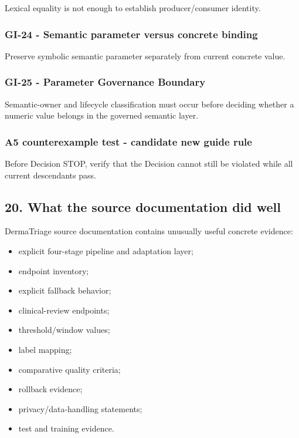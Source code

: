 \documentclass[11pt,a4paper]{article}
\providecommand{\tightlist}{\setlength{\itemsep}{0pt}\setlength{\parskip}{0pt}}
\begin{document}
Lexical equality is not enough to establish producer/consumer identity.

\subsubsection{GI-24 - Semantic parameter versus concrete
binding}\label{gi-24---semantic-parameter-versus-concrete-binding}

Preserve symbolic semantic parameter separately from current concrete
value.

\subsubsection{GI-25 - Parameter Governance
Boundary}\label{gi-25---parameter-governance-boundary}

Semantic-owner and lifecycle classification must occur before deciding
whether a numeric value belongs in the governed semantic layer.

\subsubsection{A5 counterexample test - candidate new guide
rule}\label{a5-counterexample-test---candidate-new-guide-rule}

Before Decision STOP, verify that the Decision cannot still be violated
while all current descendants pass.

\subsection{20. What the source documentation did
well}\label{20-what-the-source-documentation-did-well}

DermaTriage source documentation contains unusually useful concrete
evidence:

\begin{itemize}
\tightlist
\item
  explicit four-stage pipeline and adaptation layer;
\item
  endpoint inventory;
\item
  explicit fallback behavior;
\item
  clinical-review endpoints;
\item
  threshold/window values;
\item
  label mapping;
\item
  comparative quality criteria;
\item
  rollback evidence;
\item
  privacy/data-handling statements;
\item
  test and training evidence.
\end{itemize}
\end{document}
